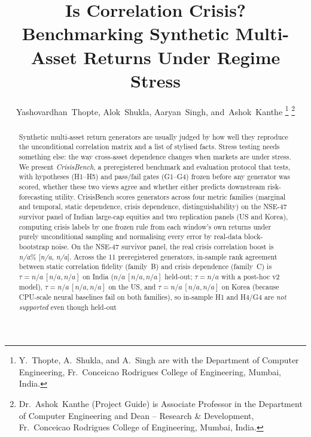 \documentclass[journal]{IEEEtran}
\newcommand{\pendingnum}{\textit{n/a}}
\providecommand{\realNseBoost}{\pendingnum}
\providecommand{\realNseBoostLo}{\pendingnum}
\providecommand{\realNseBoostHi}{\pendingnum}
\providecommand{\tauBCnseFull}{\pendingnum}
\providecommand{\tauBCnseFullPrereg}{\pendingnum}
\providecommand{\tauBCnseFullPreregLo}{\pendingnum}
\providecommand{\tauBCnseFullPreregHi}{\pendingnum}
\providecommand{\tauBCnseHeldPrereg}{\pendingnum}
\providecommand{\tauBCnseHeldPreregLo}{\pendingnum}
\providecommand{\tauBCnseHeldPreregHi}{\pendingnum}
\providecommand{\tauBCusFullPrereg}{\pendingnum}
\providecommand{\tauBCusFullPreregLo}{\pendingnum}
\providecommand{\tauBCusFullPreregHi}{\pendingnum}
\providecommand{\tauBCkrFullPrereg}{\pendingnum}
\providecommand{\tauBCkrFullPreregLo}{\pendingnum}
\providecommand{\tauBCkrFullPreregHi}{\pendingnum}
\begin{document}
\title{Is Correlation Crisis? Benchmarking Synthetic Multi-Asset Returns Under Regime Stress}

\author{Yashovardhan~Thopte, Alok~Shukla, Aaryan~Singh, and~Ashok~Kanthe%
\thanks{Y.~Thopte, A.~Shukla, and A.~Singh are with the Department of Computer Engineering, Fr.~Conceicao Rodrigues College of Engineering, Mumbai, India.}%
\thanks{Dr.~Ashok~Kanthe (Project Guide) is Associate Professor in the Department of Computer Engineering and Dean -- Research \& Development, Fr.~Conceicao Rodrigues College of Engineering, Mumbai, India.}}

\maketitle

\begin{abstract}
Synthetic multi-asset return generators are usually judged by how well they reproduce the unconditional
correlation matrix and a list of stylised facts. Stress testing needs something else: the way cross-asset
dependence changes when markets are under stress. We present \emph{CrisisBench}, a preregistered benchmark and
evaluation protocol that tests, with hypotheses (H1--H5) and pass/fail gates (G1--G4) frozen before any
generator was scored, whether these two views agree and whether either predicts downstream risk-forecasting
utility. CrisisBench scores generators across four metric families (marginal and temporal, static dependence,
crisis dependence, distinguishability) on the NSE-47 survivor panel of Indian large-cap equities and two
replication panels (US and Korea), computing crisis labels by one frozen rule from each window's own returns
under purely unconditional sampling and normalising every error by real-data block-bootstrap noise. On the
NSE-47 survivor panel, the real crisis correlation boost is \realNseBoost\% [\realNseBoostLo, \realNseBoostHi].
Across the 11 preregistered generators, in-sample rank agreement between static correlation fidelity
(family~B) and crisis dependence (family~C) is $\tau = \tauBCnseFullPrereg\,[\tauBCnseFullPreregLo,\tauBCnseFullPreregHi]$
on India ($\tauBCnseHeldPrereg\,[\tauBCnseHeldPreregLo,\tauBCnseHeldPreregHi]$ held-out; $\tau = \tauBCnseFull$
with a post-hoc v2 model), $\tau = \tauBCusFullPrereg\,[\tauBCusFullPreregLo,\tauBCusFullPreregHi]$ on the US,
and $\tau = \tauBCkrFullPrereg\,[\tauBCkrFullPreregLo,\tauBCkrFullPreregHi]$ on Korea (because CPU-scale neural
baselines fail on both families), so in-sample H1 and H4/G4 are \emph{not supported} even though held-out

\end{abstract}
\end{document}
